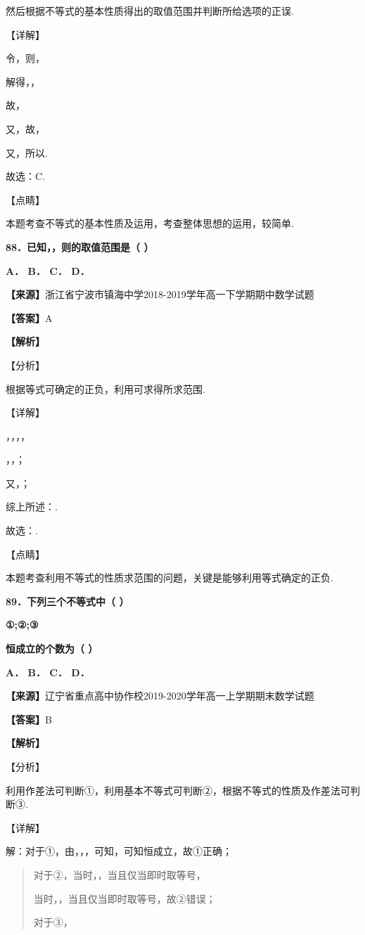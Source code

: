 然后根据不等式的基本性质得出的取值范围并判断所给选项的正误.

【详解】

令，则，

解得，，

故，

又，故，

又，所以.

故选：C.

【点睛】

本题考查不等式的基本性质及运用，考查整体思想的运用，较简单.

\textbf{88．已知，，则的取值范围是（ ）}

\textbf{A． B． C． D．}

\textbf{【来源】}浙江省宁波市镇海中学2018-2019学年高一下学期期中数学试题

\textbf{【答案】}A

\textbf{【解析】}

【分析】

根据等式可确定的正负，利用可求得所求范围.

【详解】

，，，，

，，；

又，；

综上所述：.

故选：.

【点睛】

本题考查利用不等式的性质求范围的问题，关键是能够利用等式确定的正负.

\textbf{89．下列三个不等式中（ ）}

\textbf{①;②;③}

\textbf{恒成立的个数为（ ）}

\textbf{A． B． C． D．}

\textbf{【来源】}辽宁省重点高中协作校2019-2020学年高一上学期期末数学试题

\textbf{【答案】}B

\textbf{【解析】}

【分析】

利用作差法可判断①，利用基本不等式可判断②，根据不等式的性质及作差法可判断③.

【详解】

解：对于①，由，，，可知，可知恒成立，故①正确；

\begin{quote}
对于②，当时，，当且仅当即时取等号，

当时，，当且仅当即时取等号，故②错误；

对于③，
\end{quote}

